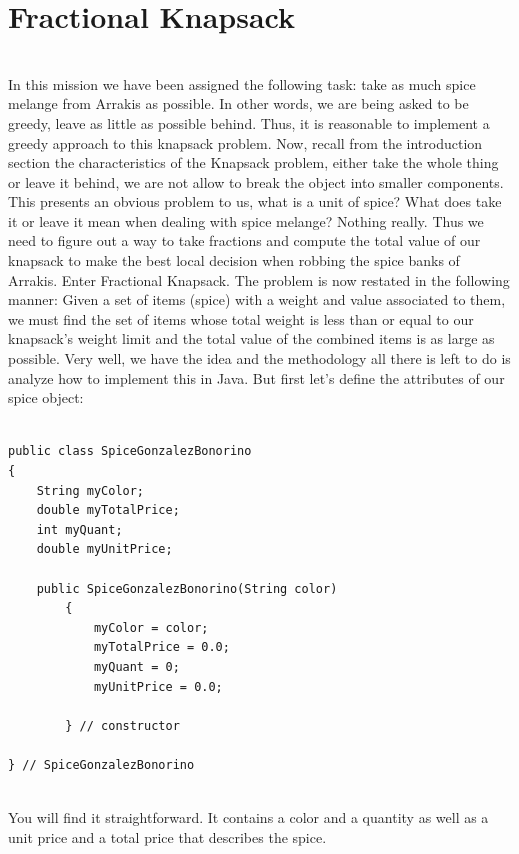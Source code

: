 \documentclass[letterpaper, 10pt]{article}
\begin{document}
\section{Fractional Knapsack}
\\
In this mission we have been assigned the following task: take as much spice melange from Arrakis as possible. In other words, we are being asked to be greedy, leave as little as possible behind. Thus, it is reasonable to implement a greedy approach to this knapsack problem. Now, recall from the introduction section the characteristics of the Knapsack problem, either take the whole thing or leave it behind, we are not allow to break the object into smaller components. This presents an obvious problem to us, what is a unit of spice? What does take it or leave it mean when dealing with spice melange? Nothing really. Thus we need to figure out a way to take fractions and compute the total value of our knapsack to make the best local decision when robbing the spice banks of Arrakis. Enter Fractional Knapsack. The problem is now restated in the following manner: Given a set of items (spice) with a weight and value associated to them, we must find the set of items whose total weight is less than or equal to our knapsack's weight limit and the total value of the combined items is as large as possible. Very well, we have the idea and the methodology all there is left to do is analyze how to implement this in Java. But first let's define the attributes of our spice object:
\begin{lstlisting}

public class SpiceGonzalezBonorino 
{
	String myColor;
	double myTotalPrice;
    int myQuant;
    double myUnitPrice;

    public SpiceGonzalezBonorino(String color)
	    {
	        myColor = color;
	        myTotalPrice = 0.0;
	        myQuant = 0;
	        myUnitPrice = 0.0;
	        
	    } // constructor
    
} // SpiceGonzalezBonorino
\end{lstlisting}
\\
You will find it straightforward. It contains a color and a quantity as well as a unit price and a total price that describes the spice.
\end{document}
